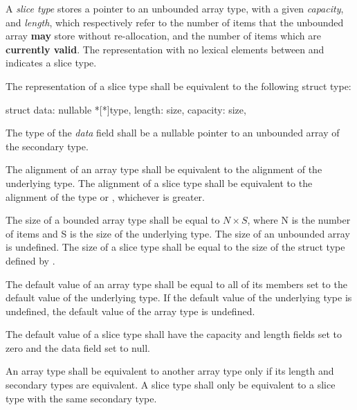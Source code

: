 \specsubsubitem
A \textit{slice type} stores a pointer to an unbounded array type, with a given
\textit{capacity}, and \textit{length}, which respectively refer to the number
of items that the unbounded array \textbf{may} store without re-allocation, and
the number of items which are \textbf{currently valid}. The representation with
no lexical elements between \terminal{[} and \terminal{]} indicates a slice
type.

\specsubsubitem
The representation of a slice type shall be equivalent to the following struct
type:

\begin{codesample}
struct {
	data: nullable *[*]type,
	length: size,
	capacity: size,
}
\end{codesample}

The type of the \textit{data} field shall be a nullable pointer to an unbounded
array of the secondary type.

\specsubsubitem
The alignment of an array type shall be equivalent to the alignment of the
underlying type. The alignment of a slice type shall be equivalent to the
alignment of the  type or , whichever is
greater.

\specsubsubitem
The size of a bounded array type shall be equal to $N \times S$, where N is the
number of items and S is the size of the underlying type. The size of an
unbounded array is undefined. The size of a slice type shall be equal to the
size of the struct type defined by .

\specsubsubitem
The default value of an array type shall be equal to all of its members set to
the default value of the underlying type. If the default value of the
underlying type is undefined, the default value of the array type is undefined.

\specsubsubitem
The default value of a slice type shall have the capacity and length fields set
to zero and the data field set to null.

\specsubsubitem
An array type shall be equivalent to another array type only if its length and
secondary types are equivalent. A slice type shall only be equivalent to a
slice type with the same secondary type.


\begin{grammar}
 \\
	 \\
\end{grammar}

